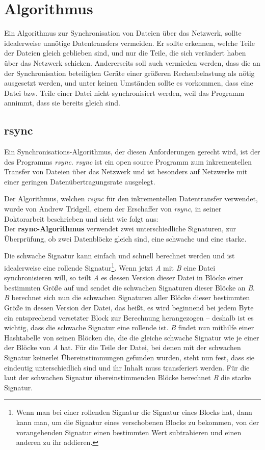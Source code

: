\section{Algorithmus}

Ein Algorithmus zur Synchronisation von Dateien über das Netzwerk, sollte idealerweise unnötige Datentransfers vermeiden.
Er sollte erkennen, welche Teile der Dateien gleich geblieben sind, und nur die Teile, die sich verändert haben über das Netzwerk schicken.
Andererseits soll auch vermieden werden, dass die an der Synchronisation beteiligten Geräte einer größeren Rechenbelastung als nötig ausgesetzt werden,
und unter keinen Umständen sollte es vorkommen, dass eine Datei bzw. Teile einer Datei nicht synchronisiert werden, weil das Programm annimmt,
dass sie bereits gleich sind.

\subsection{rsync}

Ein Synchronisations-Algorithmus, der diesen Anforderungen gerecht wird, ist der des Programms \textit{rsync}\cite{rsync}.
\textit{rsync} ist ein open source Programm zum inkrementellen Transfer von Dateien über das Netzwerk und ist besonders auf Netzwerke mit einer geringen
Datenübertragungsrate ausgelegt\cite{rsync}.

Der Algorithmus, welchen \textit{rsync} für den inkrementellen Datentransfer verwendet, wurde von Andrew Tridgell, einem der Erschaffer von 
\textit{rsync}\cite{wiki_rsync}, in seiner Doktorarbeit beschrieben\cite{Tridgell99} und sieht wie folgt aus:
\\

Der \textbf{rsync-Algorithmus} verwendet zwei unterschiedliche Signaturen, zur Überprüfung, ob zwei Datenblöcke gleich sind, eine schwache und 
eine starke\cite{Tridgell99}. 

Die schwache Signatur kann einfach und schnell berechnet werden und ist idealerweise eine rollende Signatur\footnote{Wenn man bei einer
rollenden Signatur die Signatur eines Blocks hat, dann kann man, um die Signatur eines verschobenen Blocks zu bekommen, von der vorangehenden Signatur
einen bestimmten Wert subtrahieren und einen anderen zu ihr addieren.}. Wenn jetzt \emph{A} mit \emph{B} eine Datei synchronisieren will, so teilt \emph{A} es
dessen Version dieser Datei in Blöcke einer bestimmten Größe auf und sendet die schwachen Signaturen dieser Blöcke an \emph{B}. \emph{B} berechnet sich nun
die schwachen Signaturen aller Blöcke dieser bestimmten Größe in dessen Version der Datei, das heißt, es wird beginnend bei jedem Byte ein entsprechend
versetzter Block zur Berechnung herangezogen -- deshalb ist es wichtig, dass die schwache Signatur eine rollende ist. \emph{B} findet nun mithilfe
einer Hashtabelle von seinen Blöcken die, die die gleiche schwache Signatur wie je einer der Blöcke von \emph{A} hat. Für die Teile der Datei, bei denen 
mit der schwachen Signatur keinerlei Übereinstimmungen gefunden wurden, steht nun fest, dass sie eindeutig unterschiedlich sind und ihr Inhalt muss transferiert
werden. Für die laut der schwachen Signatur übereinstimmenden Blöcke berechnet \emph{B} die starke Signatur.


